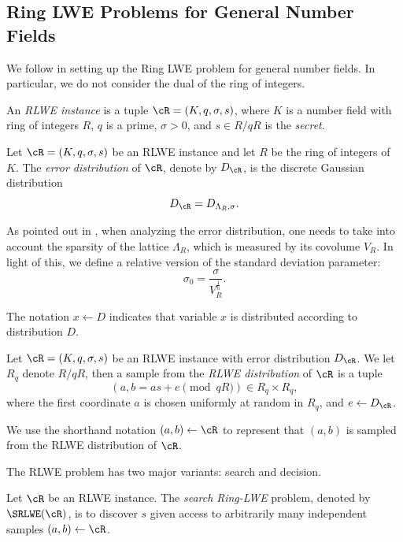 \documentclass[envcountsame]{llncs}
\begin{document}
\subsection{Ring LWE Problems for General Number Fields}

We follow \cite{elos2015weak} in setting up the Ring LWE problem for general number fields.  In particular, we do not consider the dual of the ring of integers.

\begin{definition}
An {\it RLWE instance} is a tuple $\cR = (K,q,\sigma,s)$, where $K$ is a number field with ring of integers $R$, $q$ is a prime, $\sigma >0$, and $s \in R/qR$ is the {\it secret}.
\end{definition}


\begin{definition}
Let $\cR = (K,q,\sigma,s)$ be an RLWE instance and let $R$ be the ring of integers of $K$. The {\it error distribution} of $\cR$, denote by $D_\cR$, is the discrete Gaussian distribution
\[
D_\cR = D_{\Lambda_R,\sigma}.
\]
\end{definition}

As pointed out in \cite{elos2015weak}, when analyzing the error distribution, one needs to take into account the sparsity of the lattice $\Lambda_R$, which is measured by its covolume $V_R$. In light of this, we define a relative version of the standard deviation parameter: $$\sigma_0 = \frac{\sigma}{V_R^{\frac{1}{n}}}.$$

The notation $x \gets D$ indicates that variable $x$ is distributed according to distribution $D$.

\begin{definition}
Let $\cR = (K,q,\sigma, s)$ be an RLWE instance with error distribution $D_\cR$. We let $R_q$ denote $R/qR$, then
a sample from the {\it RLWE distribution} of $\cR$ is a tuple
$$(a, b = as+e\pmod{qR}) \in R_q \times R_q, $$
where the first coordinate $a$ is chosen uniformly at random in $R_q$, and $e \gets D_\cR$.
\end{definition}

We use the shorthand notation $(a,b) \gets \cR$ to represent that $(a,b)$ is sampled from the RLWE distribution of $\cR$.

The RLWE problem has two major variants: search and decision.

\begin{definition}
Let $\cR$ be an RLWE instance. The {\it search Ring-LWE} problem, denoted by $\SRLWE(\cR)$, is to discover $s$ given access to arbitrarily many independent samples $(a,b) \gets \cR$.
\end{definition}
\end{document}
